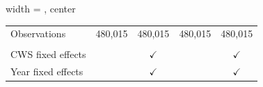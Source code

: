 \begin{table}[htbp]
\begin{adjustbox}{width = \textwidth, center}
\begin{tabular}{lcccc}
          \\
         
         Observations                                 & 480,015         & 480,015         & 480,015         & 480,015\\  
         
          \\
         
         CWS fixed effects                            &                 & $\checkmark$    &                 & $\checkmark$\\   
         Year fixed effects                           &                 & $\checkmark$    &                 & $\checkmark$\\   
         
         \bottomrule
         
      \end{tabular}
      
      

\end{adjustbox}
\end{table}

